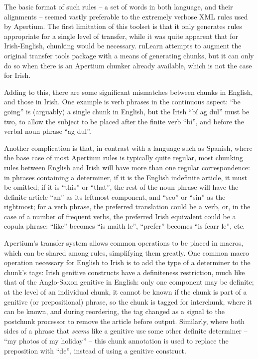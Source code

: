The basic format of such rules -- a set of words in both language, and their alignments -- seemed
vastly preferable to the extremely verbose XML rules used by Apertium. The first limitation of
this toolset is that it only generates rules appropriate for a single level of transfer, while
it was quite apparent that for Irish-English, chunking would be necessary. ruLearn attempts
to augment the original transfer tools package with a means of generating chunks, but it can
only do so when there is an Apertium chunker already available, which is not the case for Irish.

Adding to this, there are some significant mismatches between chunks in English, and those in
Irish. One example is verb phrases in the continuous aspect: ``be going'' is (arguably) a single
chunk in English, but the Irish ``b\'i ag dul'' must be two, to allow the subject to be placed
after the finite verb ``b\'i'', and before the verbal noun phrase ``ag dul''. 

Another complication is that, in contrast with a language such as Spanish, where the base case of
most Apertium rules is typically quite regular, most chunking rules between English and Irish
will have more than one regular correspondence: in phrases containing a determiner, if it is
the English indefinite article, it must be omitted; if it is ``this'' or ``that'', the rest of
the noun phrase will have the definite article ``an'' as its leftmost component, and ``seo'' or
``sin'' as the rightmost; for a verb phrase, the preferred translation could be a verb, or, in
the case of a number of frequent verbs, the preferred Irish equivalent could be a copula phrase:
``like'' becomes ``is maith le'', ``prefer'' becomes ``is fearr le'', etc.

Apertium's transfer system allows common operations to be placed in macros, which can be shared
among rules, simplifying them greatly. One common macro operation necessary for English to Irish
is to add the type of a determiner to the chunk's tags: Irish genitive constructs have a definiteness
restriction, much like that of the Anglo-Saxon genitive in English: only one component may be definite;
at the level of an individual chunk, it cannot be known if the chunk is part of a genitive (or
prepositional) phrase, so the chunk is tagged for interchunk, where it can be known, and during
reordering, the tag changed as a signal to the postchunk processor to remove the article before
output. Similarly, where both sides of a phrase that \textit{seems} like a genitive use some
other definite determiner -- ``my photos of my holiday'' -- this chunk annotation is used to
replace the preposition with ``de'', instead of using a genitive construct.

